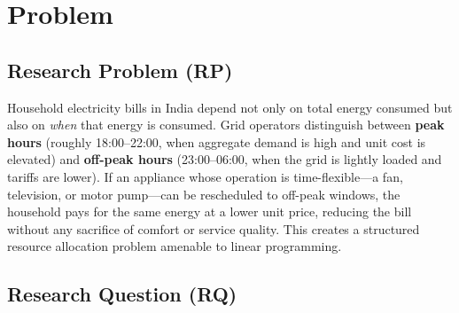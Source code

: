 \documentclass[12pt,a4paper]{article}
\begin{document}
\begin{abstract}
This report formulates the household electricity bill minimisation problem as a linear
programme (LP) under a two-period peak/off-peak tariff structure. Appliance-level
annual demands are computed from a Kaggle dataset of 45{,}345 household-month
observations across six appliances and twelve calendar months. Using an average
observed tariff $\bar{c} = 8.3696$ Rs./kWh, peak and off-peak rates of $1.2\bar{c}$
and $0.8\bar{c}$ are constructed. The LP is solved in R using the \texttt{lpSolve}
package. We prove analytically via KKT conditions that the unique optimal solution
satisfies $x^*_i = R_i$ for all appliances, and that the optimised cost equals
exactly $\tfrac{2}{3}$ of the baseline, guaranteeing a saving of
$\tfrac{1}{3} \approx 33.3\%$. A stochastic extension with random tariff
$C \sim \mathcal{N}(\mu, \sigma^2)$ confirms the result holds in expectation.
The annual bill falls from Rs.~2{,}39{,}40{,}746 to Rs.~1{,}59{,}60{,}497,
saving Rs.~79{,}80{,}249 at an efficiency of Rs.~3.35 per kWh.
\end{abstract}


\section{Problem}

\subsection{Research Problem (RP)}

Household electricity bills in India depend not only on total energy consumed but
also on \emph{when} that energy is consumed. Grid operators distinguish between
\textbf{peak hours} (roughly 18:00–22:00, when aggregate demand is high and unit
cost is elevated) and \textbf{off-peak hours} (23:00–06:00, when the grid is
lightly loaded and tariffs are lower). If an appliance whose operation is
time-flexible---a fan, television, or motor pump---can be rescheduled to off-peak
windows, the household pays for the same energy at a lower unit price, reducing
the bill without any sacrifice of comfort or service quality. This creates a
structured resource allocation problem amenable to linear programming.

\subsection{Research Question (RQ)}
\end{document}
